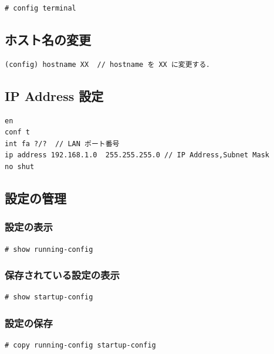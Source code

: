 \documentclass[uplatex,dvipdfmx]{bxjsarticle}
\begin{document}
\begin{lstlisting}[caption={コンフィグモードに入る}]
# config terminal
\end{lstlisting}

\subsection{ホスト名の変更}

\begin{lstlisting}[caption={ホスト名の変更}]
(config) hostname XX  // hostname を XX に変更する．
\end{lstlisting}

\subsection{IP Address 設定}

\begin{lstlisting}[caption=IP Address Settings]
en
conf t
int fa ?/?  // LAN ポート番号
ip address 192.168.1.0  255.255.255.0 // IP Address,Subnet Mask
no shut
\end{lstlisting}

\subsection{設定の管理}

\subsubsection{設定の表示}

\begin{lstlisting}[caption={設定の表示}]
# show running-config
\end{lstlisting}

\subsubsection{保存されている設定の表示}

\begin{lstlisting}[caption={保存されている設定の表示}]
# show startup-config
\end{lstlisting}

\subsubsection{設定の保存}

\begin{lstlisting}[caption={設定の保存}]
# copy running-config startup-config
\end{lstlisting}
\end{document}
